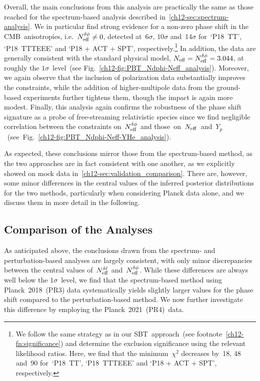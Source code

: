 Overall, the main conclusions from this analysis are practically the same as those reached for the spectrum-based analysis described in~\textsection\ref{ch12-sec:spectrum-analysis}. We in particular find strong evidence for a non-zero phase shift in the CMB~anisotropies, i.e.\ $N_\mathrm{eff}^{\delta\phi} \neq 0$, detected at~$6\sigma$, $10\sigma$ and~$14\sigma$ for~`P18~TT', `P18~TTTEEE' and `P18 + ACT + SPT', respectively.\footnote{We follow the same strategy as in our SBT~approach~(see footnote~\ref{ch12-fn:significance}) and determine the exclusion significance using the relevant likelihood ratios. Here, we find that the minimum~$\chi^2$ decreases by~18, 48 and~90 for~`P18~TT', `P18~TTTEEE' and `P18 + ACT + SPT', respectively.} In addition, the data are generally consistent with the standard physical model, $N_\mathrm{eff} = N_\mathrm{eff}^{\delta\phi} = 3.044$, at roughly the $1\sigma$~level~(see Fig.~\ref{ch12-fig:PBT_Ndphi-Neff_analysis}). Moreover, we again observe that the inclusion of polarization data substantially improves the constraints, while the addition of higher-multipole data from the ground-based experiments further tightens them, though the impact is again more modest. Finally, this analysis again confirms the robustness of the phase shift signature as a probe of free-streaming relativistic species since we find negligible correlation between the constraints on~$N_\mathrm{eff}^{\delta\phi}$ and \mbox{those on~$N_\mathrm{eff}$ and~$Y_p$~(see Fig.~\ref{ch12-fig:PBT_Ndphi-Neff-YHe_analysis}).}

As expected, these conclusions mirror those from the spectrum-based method, as the two approaches are in fact consistent with one another, as we explicitly showed on mock data in~\textsection\ref{ch12-sec:validation_comparison}. There are, however, some minor differences in the central values of the inferred posterior distributions for the two methods, particularly when considering Planck data alone, and we discuss them in more detail in the following.


\subsection{Comparison of the Analyses}
\label{ch12-sec:comparison-data}

As anticipated above, the conclusions drawn from the spectrum- and perturbation-based analyses are largely consistent, with only minor discrepancies between the central values of~$N_\mathrm{eff}^{\delta\ell}$ and~$N_\mathrm{eff}^{\delta\phi}$. While these differences are always well below the $1\sigma$~level, we find that the spectrum-based method using Planck~2018~(PR3) data systematically yields slightly larger values for the phase shift compared to the perturbation-based method. We now further investigate this difference by employing the Planck~2021~(PR4)~data.\medskip

